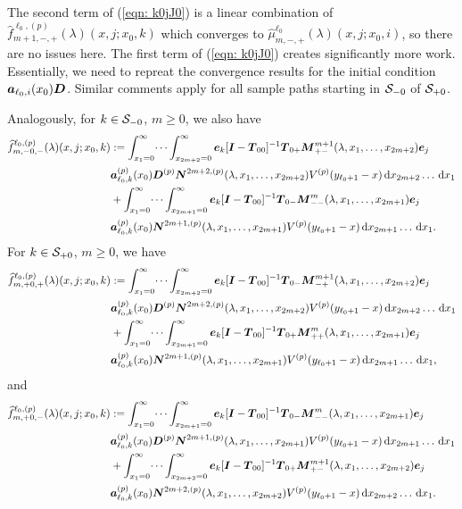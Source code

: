 The second term of (\ref{eqn: k0jJ0}) is a linear combination of \(\widehat{f}_{m+1,-,+}^{\ell_0,(p)}(\lambda)(x,j;x_0,k)\) which converges to \(\widehat \mu_{m,-,+}^{\ell_0}(\lambda)(x,j;x_0,i)\), so there are no issues here. The first term of (\ref{eqn: k0jJ0}) creates significantly more work. Essentially, we need to repreat the convergence results for the initial condition \(\boldsymbol a_{\ell_0,i}(x_0)\boldsymbol D\). Similar comments apply for all sample paths starting in \(\mathcal{S}_{-0}\) of \(\mathcal{S}_{+0}\).

Analogously, for \(k\in\mathcal{S}_{-0}\), \(m\geq 0\), we also have 
\begin{align*}
	\widehat{f}_{m,-0,-}^{\ell_0,(p)}(\lambda)(x,j;x_0,k)\nonumber 
	&:=\int_{x_1=0}^\infty \dots \int_{x_{2m+2}=0}^\infty  \boldsymbol e_k [\boldsymbol I - \boldsymbol T_{00}]^{-1}\boldsymbol T_{0+} \boldsymbol M^{m+1}_{+-}(\lambda,x_1,\dots,x_{2m+2})\boldsymbol e_j \nonumber
	\\& \boldsymbol a_{\ell_0,k}^{(p)}(x_0) \boldsymbol D^{(p)} \boldsymbol N^{2m+2,(p)}(\lambda,x_1,\dots,x_{2m+2}) V^{(p)}(y_{\ell_0+1}-x)\, \mathrm{d} x_{2m+2}\dots  \, \mathrm{d} x_1  \nonumber
	\\& + \int_{x_1=0}^\infty \dots \int_{x_{2m+1}=0}^\infty  \boldsymbol e_k [\boldsymbol I - \boldsymbol T_{00}]^{-1}\boldsymbol T_{0-} \boldsymbol M^{m}_{--}(\lambda,x_1,\dots,x_{2m+1})\boldsymbol e_j \nonumber
	\\& \boldsymbol a_{\ell_0,k}^{(p)}(x_0)\boldsymbol N^{2m+1,(p)}(\lambda,x_1,\dots,x_{2m+1}) V^{(p)}(y_{\ell_0+1}-x)\, \mathrm{d} x_{2m+1}\dots\, \mathrm{d} x_1.
\end{align*}
For \(k\in\mathcal{S}_{+0}\), \(m\geq 0\), we have 
\begin{align*}
	\widehat{f}_{m,+0,+}^{\ell_0,(p)}(\lambda)(x,j;x_0,k)\nonumber 
	&:=\int_{x_1=0}^\infty \dots \int_{x_{2m+2}=0}^\infty \boldsymbol e_k [\boldsymbol I - \boldsymbol T_{00}]^{-1}\boldsymbol T_{0-} \boldsymbol M^{m+1}_{-+}(\lambda,x_1,\dots,x_{2m+2})\boldsymbol e_j \nonumber
	\\& \boldsymbol a_{\ell_0,k}^{(p)}(x_0) \boldsymbol D^{(p)} \boldsymbol N^{2m+2,(p)}(\lambda,x_1,\dots,x_{2m+2}) V^{(p)}(y_{\ell_0+1}-x)\, \mathrm{d} x_{2m+2}\dots  \, \mathrm{d} x_1  \nonumber
	\\& + \int_{x_1=0}^\infty \dots \int_{x_{2m+1}=0}^\infty  \boldsymbol e_k [\boldsymbol I - \boldsymbol T_{00}]^{-1}\boldsymbol T_{0+} \boldsymbol M^m_{++}(\lambda,x_1,\dots,x_{2m+1})\boldsymbol e_j \nonumber
	\\& \boldsymbol a_{\ell_0,k}^{(p)}(x_0)\boldsymbol N^{2m+1,(p)}(\lambda,x_1,\dots,x_{2m+1}) V^{(p)}(y_{\ell_0+1}-x)\, \mathrm{d} x_{2m+1}\dots  \, \mathrm{d} x_1,
\end{align*}
and 
\begin{align*}
	\widehat{f}_{m,+0,-}^{\ell_0,(p)}(\lambda)(x,j;x_0,k)\nonumber 
	&:=\int_{x_1=0}^\infty \dots \int_{x_{2m+1}=0}^\infty  \boldsymbol e_k [\boldsymbol I - \boldsymbol T_{00}]^{-1}\boldsymbol T_{0-} \boldsymbol M^m_{--}(\lambda,x_1,\dots,x_{2m+1})\boldsymbol e_j \nonumber
	\\& \boldsymbol a_{\ell_0,k}^{(p)}(x_0) \boldsymbol D^{(p)} \boldsymbol N^{2m+1,(p)}(\lambda,x_1,\dots,x_{2m+1}) V^{(p)}(y_{\ell_0+1}-x)\, \mathrm{d} x_{2m+1}\dots  \, \mathrm{d} x_1  \nonumber
	\\& + \int_{x_1=0}^\infty \dots \int_{x_{2m+2}=0}^\infty  \boldsymbol e_k [\boldsymbol I - \boldsymbol T_{00}]^{-1}\boldsymbol T_{0+} \boldsymbol M^{m+1}_{+-}(\lambda,x_1,\dots,x_{2m+2})\boldsymbol e_j \nonumber
	\\& \boldsymbol a_{\ell_0,k}^{(p)}(x_0)\boldsymbol N^{2m+2,(p)}(\lambda,x_1,\dots,x_{2m+2}) V^{(p)}(y_{\ell_0+1}-x)\, \mathrm{d} x_{2m+2}\dots  \, \mathrm{d} x_1.
\end{align*}
